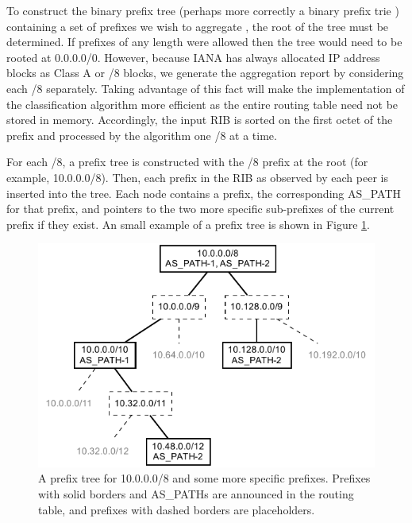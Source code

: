 To construct the binary prefix tree (perhaps more correctly a binary prefix
trie \cite{Wu:2008fk}) containing a set of prefixes we wish to aggregate , the
root of the tree must be determined. If prefixes of any length were allowed
then the tree would need to be rooted at 0.0.0.0/0. However, because IANA has
always allocated IP address blocks as Class A or /8 blocks, we generate the
aggregation report by considering each /8 separately. Taking advantage of this
fact will make the implementation of the classification algorithm more
efficient as the entire routing table need not be stored in memory.
Accordingly, the input RIB is sorted on the first octet of the prefix and
processed by the algorithm one /8 at a time.

For each /8, a prefix tree is constructed with the /8 prefix at the root (for
example, 10.0.0.0/8). Then, each prefix in the RIB as observed by each peer
is inserted into the tree. Each node contains a prefix, the corresponding
AS\_PATH for that prefix, and pointers to the two more specific sub-prefixes of
the current prefix if they exist. An small example of a prefix tree is shown in
Figure \ref{fig:ex_prefix_tree}.

\begin{figure}
\begin{center}
    \includegraphics{figures/ex_prefix_tree.pdf}
    \caption[A prefix tree representing a /8 and longer prefixes]{A prefix tree
    for 10.0.0.0/8 and some more specific prefixes. Prefixes with solid borders
    and AS\_PATHs are announced in the routing table, and prefixes with dashed
    borders are placeholders.}
    \label{fig:ex_prefix_tree}
\end{center}
\end{figure}

